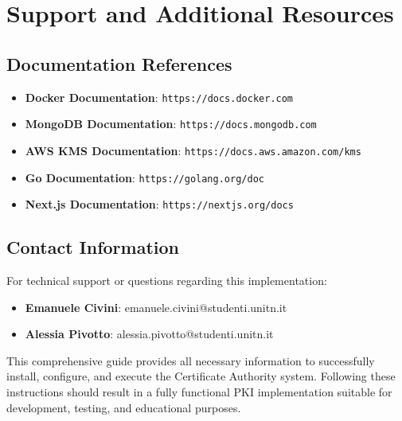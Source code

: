 \section{Support and Additional Resources}

\subsection{Documentation References}

\begin{itemize}
    \item \textbf{Docker Documentation}: \texttt{https://docs.docker.com}
    \item \textbf{MongoDB Documentation}: \texttt{https://docs.mongodb.com}
    \item \textbf{AWS KMS Documentation}: \texttt{https://docs.aws.amazon.com/kms}
    \item \textbf{Go Documentation}: \texttt{https://golang.org/doc}
    \item \textbf{Next.js Documentation}: \texttt{https://nextjs.org/docs}
\end{itemize}

\subsection{Contact Information}

For technical support or questions regarding this implementation:
\begin{itemize}
    \item \textbf{Emanuele Civini}: emanuele.civini@studenti.unitn.it
    \item \textbf{Alessia Pivotto}: alessia.pivotto@studenti.unitn.it
\end{itemize}

This comprehensive guide provides all necessary information to successfully install, configure, and execute the Certificate Authority system. Following these instructions should result in a fully functional PKI implementation suitable for development, testing, and educational purposes.